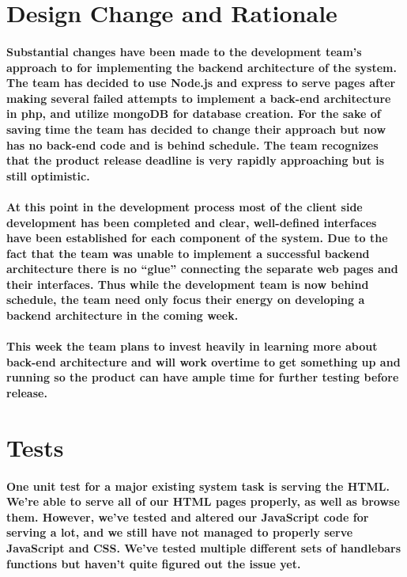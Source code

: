 \documentclass[12pt]{article}
\begin{document}
\section{\bf Design Change and Rationale}

  \paragraph{\normalfont \indent Substantial changes have been made to the development team’s approach to for implementing the backend architecture of the system. The team has decided to use Node.js and express to serve pages after making several failed attempts to implement a back-end architecture in php, and utilize mongoDB for database creation. For the sake of saving time the team has decided to change their approach but now has no back-end code and is behind schedule. The team recognizes that the product release deadline is very rapidly approaching but is still optimistic.
  }
  \paragraph{\normalfont \indent At this point in the development process most of the client side development has been completed and clear, well-defined interfaces have been established for each component of the system. Due to the fact that the team was unable to implement a successful backend architecture there is no “glue” connecting the separate web pages and their interfaces. Thus while the development team is now behind schedule, the team need only focus their energy on developing a backend architecture in the coming week.
  }
  \paragraph{\normalfont \indent This week the team plans to invest heavily in learning more about back-end architecture and will work overtime to get something up and running so the product can have ample time for further testing before release.
  }

\section{\bf Tests}

\paragraph{\normalfont \indent One unit test for a major existing system task is serving the HTML. We’re able to serve all of our HTML pages properly, as well as browse them. However, we’ve tested and altered our JavaScript code for serving a lot, and we still have not managed to properly serve JavaScript and CSS. We’ve tested multiple different sets of handlebars functions but haven’t quite figured out the issue yet.
}
\end{document}

